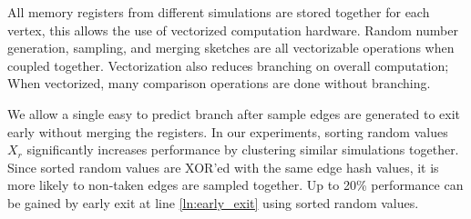 \documentclass[10pt,journal,compsoc]{IEEEtran}
\begin{document}
 All memory registers from different simulations are stored together for each vertex, this allows the use of vectorized computation hardware. Random number generation, sampling, and merging sketches are all vectorizable operations when coupled together. Vectorization also reduces branching on overall computation; When vectorized, many comparison operations are done without branching. 

We allow a single easy to predict branch after sample edges are generated to exit early without merging the registers. In our experiments, sorting random values $X_r$ significantly increases performance by clustering similar simulations together. Since sorted random values are XOR'ed with the same edge hash values, it is more likely to non-taken edges are sampled together. Up to 20\% performance can be gained by early exit at line \ref{ln:early_exit} using sorted random values.





\end{document}
